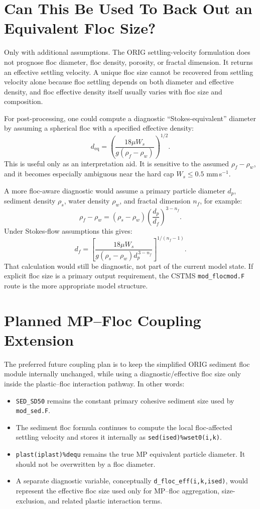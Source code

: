\documentclass[11pt]{article}
\begin{document}
\section*{Can This Be Used To Back Out an Equivalent Floc Size?}

Only with additional assumptions.  The ORIG settling-velocity formulation does
not prognose floc diameter, floc density, porosity, or fractal dimension.  It
returns an effective settling velocity.  A unique floc size cannot be recovered
from settling velocity alone because floc settling depends on both diameter and
effective density, and floc effective density itself usually varies with floc
size and composition.

For post-processing, one could compute a diagnostic ``Stokes-equivalent''
diameter by assuming a spherical floc with a specified effective density:
\[
  d_{\mathrm{eq}} =
  \left(\frac{18\mu W_s}{g(\rho_f-\rho_w)}\right)^{1/2}.
\]
This is useful only as an interpretation aid.  It is sensitive to the assumed
\(\rho_f-\rho_w\), and it becomes especially ambiguous near the hard cap
\(W_s \le 0.5\) mm\,s$^{-1}$.

A more floc-aware diagnostic would assume a primary particle diameter
\(d_p\), sediment density \(\rho_s\), water density \(\rho_w\), and fractal
dimension \(n_f\), for example:
\[
  \rho_f-\rho_w = (\rho_s-\rho_w)
  \left(\frac{d_p}{d_f}\right)^{3-n_f}.
\]
Under Stokes-flow assumptions this gives:
\[
  d_f =
  \left[
  \frac{18\mu W_s}{g(\rho_s-\rho_w)d_p^{\,3-n_f}}
  \right]^{1/(n_f-1)}.
\]
That calculation would still be diagnostic, not part of the current model
state.  If explicit floc size is a primary output requirement, the CSTMS
\texttt{mod\_flocmod.F} route is the more appropriate model structure.

\section*{Planned MP--Floc Coupling Extension}

The preferred future coupling plan is to keep the simplified ORIG sediment
floc module internally unchanged, while using a diagnostic/effective floc size
only inside the plastic--floc interaction pathway.  In other words:
\begin{itemize}
  \item \texttt{SED\_SD50} remains the constant primary cohesive sediment size
        used by \texttt{mod\_sed.F}.
  \item The sediment floc formula continues to compute the local
        floc-affected settling velocity and stores it internally as
        \texttt{sed(ised)\%wset0(i,k)}.
  \item \texttt{plast(iplast)\%dequ} remains the true MP equivalent particle
        diameter.  It should not be overwritten by a floc diameter.
  \item A separate diagnostic variable, conceptually
        \texttt{d\_floc\_eff(i,k,ised)}, would represent the effective floc
        size used only for MP--floc aggregation, size-exclusion, and related
        plastic interaction terms.
\end{itemize}
\end{document}

